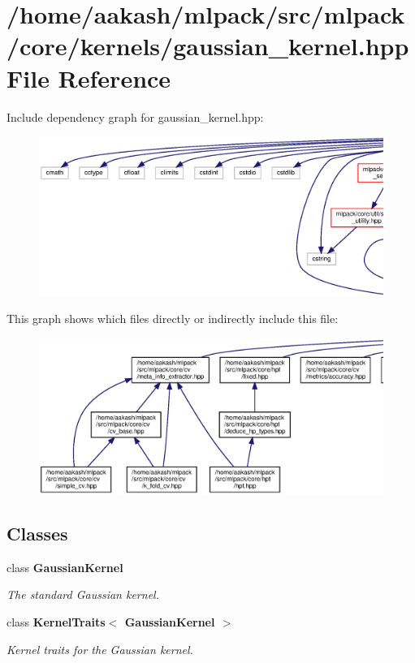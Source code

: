 \section{/home/aakash/mlpack/src/mlpack/core/kernels/gaussian\+\_\+kernel.hpp File Reference}
\label{gaussian__kernel_8hpp}
Include dependency graph for gaussian\+\_\+kernel.\+hpp\+:
\nopagebreak
\begin{figure}[H]
\begin{center}
\leavevmode
\includegraphics[width=350pt]{gaussian__kernel_8hpp__incl}
\end{center}
\end{figure}
This graph shows which files directly or indirectly include this file\+:
\nopagebreak
\begin{figure}[H]
\begin{center}
\leavevmode
\includegraphics[width=350pt]{gaussian__kernel_8hpp__dep__incl}
\end{center}
\end{figure}
\subsection*{Classes}
\begin{DoxyCompactItemize}
\item 
class \textbf{ Gaussian\+Kernel}
\begin{DoxyCompactList}\small\item\em The standard Gaussian kernel. \end{DoxyCompactList}\item 
class \textbf{ Kernel\+Traits$<$ Gaussian\+Kernel $>$}
\begin{DoxyCompactList}\small\item\em Kernel traits for the Gaussian kernel. \end{DoxyCompactList}\end{DoxyCompactItemize}
